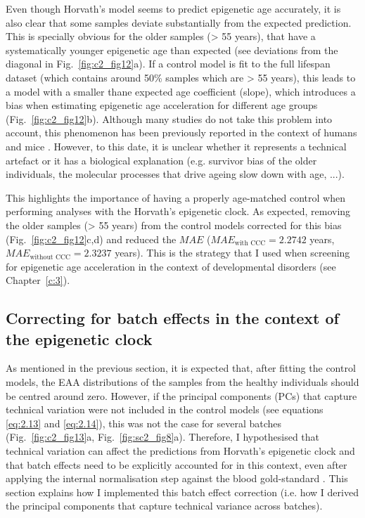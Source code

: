 \bigskip

Even though Horvath's model seems to predict epigenetic age accurately, it is also clear that some samples deviate substantially from the expected prediction. This is specially obvious for the older samples (> 55 years), that have a systematically younger epigenetic age than expected (see deviations from the diagonal in  Fig.~\ref{fig:c2_fig12}a). If a control model is fit to the full lifespan dataset (which contains around 50\% samples which are > 55 years), this leads to a model with a smaller thane expected age coefficient (slope), which introduces a bias when estimating epigenetic age acceleration for different age groups (Fig.~\ref{fig:c2_fig12}b). Although many studies do not take this problem into account, this phenomenon has been previously reported in the context of humans \cite{ElKhoury2018,Marioni2018} and mice \cite{Stubbs2017}. However, to this date, it is unclear whether it represents a technical artefact or it has a biological explanation (e.g. survivor bias of the older individuals, the molecular processes that drive ageing slow down with age, ...). 

\bigskip

This highlights the importance of having a properly age-matched control when performing analyses with the Horvath's epigenetic clock. As expected, removing the older samples (> 55 years) from the control models corrected for this bias (Fig.~\ref{fig:c2_fig12}c,d) and reduced the $MAE$ ($MAE_{\text{with CCC}} = 2.2742$ years, $MAE_{\text{without CCC}} = 2.3237$ years). This is the strategy that I used when screening for epigenetic age acceleration in the context of developmental disorders (see Chapter~\ref{c:3}).

\smallskip

\subsection{Correcting for batch effects in the context of the epigenetic clock} \label{s:2.2.3}

\smallskip

As mentioned in the previous section, it is expected that, after fitting the control models, the EAA distributions of the samples from the healthy individuals should be centred around zero. However, if the principal components (\acrshort{PC}s) that capture technical variation were not included in the control models (see equations \ref{eq:2.13} and \ref{eq:2.14}), this was not the case for several batches (Fig.~\ref{fig:c2_fig13}a, Fig.~\ref{fig:sc2_fig8}a). Therefore, I hypothesised that technical variation can affect the predictions from Horvath's epigenetic clock and that batch effects need to be explicitly accounted for in this context, even after applying the internal normalisation step against the blood gold-standard \cite{Horvath2013}. This section explains how I implemented this batch effect correction (i.e. how I derived the principal components that capture technical variance across batches).

